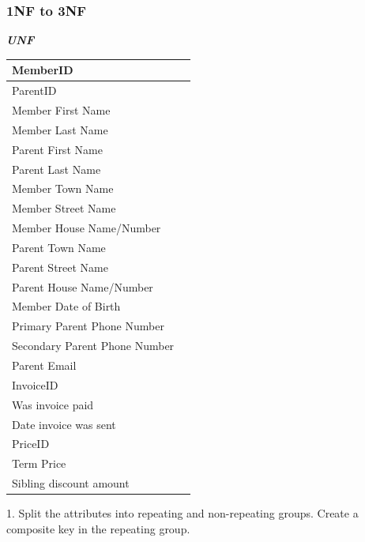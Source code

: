 \subsubsection{1NF to 3NF}

\textbf{\textit{UNF}}
\begin{center}
	\begin{tabular}{|p{4cm}|p{4cm}|}
		\hline
		MemberID \\ \hline
		ParentID \\ \hline
		Member First Name  \\ \hline
		Member Last Name \\ \hline
		Parent First Name \\ \hline
		Parent Last Name \\ \hline
		Member Town Name \\ \hline
		Member Street Name \\ \hline
		Member House Name/Number \\ \hline
		Parent Town Name \\ \hline
		Parent Street Name \\ \hline
		Parent House Name/Number \\ \hline
		Member Date of Birth \\ \hline
		Primary Parent Phone Number \\ \hline
		Secondary Parent Phone Number \\ \hline
		Parent Email \\ \hline
		InvoiceID \\ \hline
		Was invoice paid \\ \hline
		Date invoice was sent \\ \hline
		PriceID \\ \hline
		Term Price \\ \hline
		Sibling discount amount \\ \hline
	\end{tabular}
\end{center}

1. Split the attributes into repeating and non-repeating groups. Create a composite key in the repeating group.

